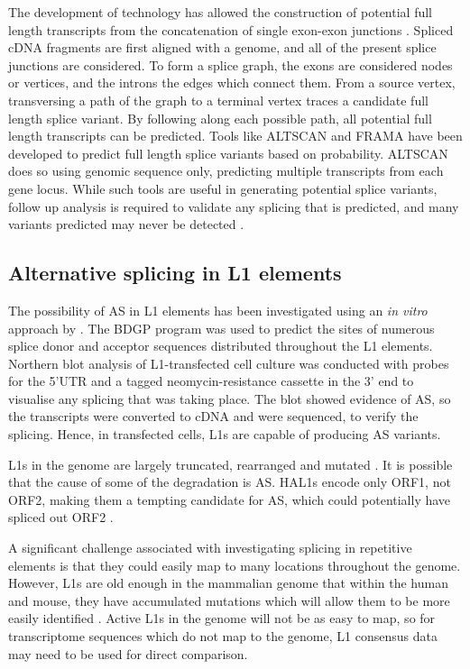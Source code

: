 \documentclass[12pt]{article}
\begin{document}
			The development of technology has allowed the construction of potential full length transcripts from the concatenation of single exon-exon junctions \citep{Florea06}.
			Spliced cDNA fragments are first aligned with a genome, and all of the present splice junctions are considered.
			To form a splice graph, the exons are considered nodes or vertices, and the introns the edges which connect them. 
			From a source vertex, transversing a path of the graph to a terminal vertex traces a candidate full length splice variant. 
			By following along each possible path, all potential full length transcripts can be predicted.
			Tools like ALTSCAN \citep{Hu15} and FRAMA \citep{Bens16} have been developed to predict full length splice variants based on probability.
			ALTSCAN does so using genomic sequence only, predicting multiple transcripts from each gene locus. 
			While such tools are useful in generating potential splice variants, follow up analysis is required to validate any splicing that is predicted, and many variants predicted may never be detected \citep{Florea06, Hu15}. 
				
		\subsection{Alternative splicing in L1 elements}
	
			The possibility of AS in L1 elements has been investigated using an \textit{in vitro} approach by \citet{Belancio06}.
			The BDGP program \citep{Reese97} was used to predict the sites of numerous splice donor and acceptor sequences distributed throughout the L1 elements. 
			Northern blot analysis of L1-transfected cell culture was conducted with probes for the 5'UTR and a tagged neomycin-resistance cassette in the 3' end to visualise any splicing that was taking place.
			The blot showed evidence of AS, so the transcripts were converted to cDNA and were sequenced, to verify the splicing. 
			Hence, in transfected cells, L1s are capable of producing AS variants.
			
			L1s in the genome are largely truncated, rearranged and mutated \citep{Goodier13}. 
			It is possible that the cause of some of the degradation is AS. 
			HAL1s encode only ORF1, not ORF2, making them a tempting candidate for AS, which could potentially have spliced out ORF2 \citep{Bao10}.
			
			A significant challenge associated with investigating splicing in repetitive elements is that they could easily map to many locations throughout the genome.
			However, L1s are old enough in the mammalian genome that within the human and mouse, they have accumulated mutations which will allow them to be more easily identified \citep{Brouha03,Goodier13}.
			Active L1s in the genome will not be as easy to map, so for transcriptome sequences which do not map to the genome, L1 consensus data may need to be used for direct comparison.
	
\end{document}
